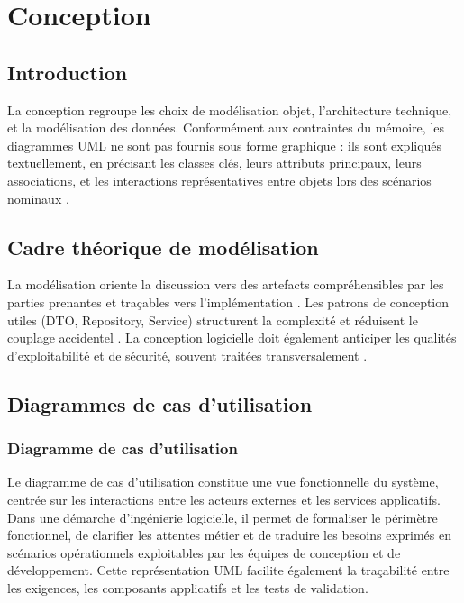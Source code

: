 \chapter{Conception}
\label{chap:conception}

\section{Introduction}

La conception regroupe les choix de modélisation objet, l'architecture technique, et la modélisation des données. Conformément aux contraintes du mémoire, les diagrammes UML ne sont pas fournis sous forme graphique : ils sont expliqués textuellement, en précisant les classes clés, leurs attributs principaux, leurs associations, et les interactions représentatives entre objets lors des scénarios nominaux \cite{booch2005,bass2021}.

\section{Cadre théorique de modélisation}

La modélisation oriente la discussion vers des artefacts compréhensibles par les parties prenantes et traçables vers l'implémentation \cite{booch2005}. Les patrons de conception utiles (DTO, Repository, Service) structurent la complexité et réduisent le couplage accidentel \cite{gamma1994,fowler2002}. La conception logicielle doit également anticiper les qualités d'exploitabilité et de sécurité, souvent traitées transversalement \cite{iso25010,owasp2021}.

\newpage
\section{Diagrammes de cas d'utilisation}

\subsection{Diagramme de cas d'utilisation}

Le diagramme de cas d'utilisation constitue une vue fonctionnelle du système, centrée sur les interactions entre les acteurs externes et les services applicatifs. Dans une démarche d'ingénierie logicielle, il permet de formaliser le périmètre fonctionnel, de clarifier les attentes métier et de traduire les besoins exprimés en scénarios opérationnels exploitables par les équipes de conception et de développement. Cette représentation UML facilite également la traçabilité entre les exigences, les composants applicatifs et les tests de validation.

